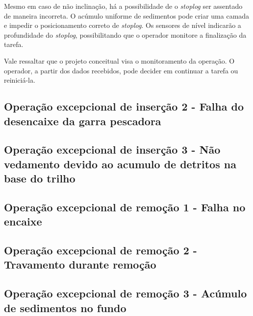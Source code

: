 Mesmo em caso de não inclinação, há a possibilidade de o \emph{stoplog} ser assentado de maneira incorreta. O acúmulo uniforme de sedimentos pode criar uma camada e impedir o posicionamento correto de \emph{stoplog}. Os sensores de nível indicarão a profundidade do \emph{stoplog}, possibilitando que o operador monitore a finalização da tarefa.

Vale ressaltar que o projeto conceitual visa o monitoramento da operação. O operador, a partir dos dados recebidos, pode decider em continuar a tarefa ou reiniciá-la.

\subsection{Operação excepcional de inserção 2 - Falha do desencaixe da garra pescadora}

\subsection{Operação excepcional de inserção 3 - Não vedamento devido ao acumulo de detritos na base do trilho}

\subsection{Operação excepcional de remoção 1 - Falha no encaixe}

\subsection{Operação excepcional de remoção 2 - Travamento durante remoção}


\subsection{Operação excepcional de remoção 3 - Acúmulo de sedimentos no fundo}

